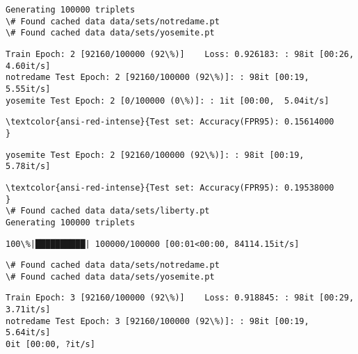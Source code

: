 \documentclass[11pt]{article}
\begin{document}
    \begin{Verbatim}[commandchars=\\\{\}]
Generating 100000 triplets
\# Found cached data data/sets/notredame.pt
\# Found cached data data/sets/yosemite.pt

    \end{Verbatim}

    \begin{Verbatim}[commandchars=\\\{\}]
Train Epoch: 2 [92160/100000 (92\%)]	Loss: 0.926183: : 98it [00:26,  4.60it/s]
notredame Test Epoch: 2 [92160/100000 (92\%)]: : 98it [00:19,  5.55it/s]
yosemite Test Epoch: 2 [0/100000 (0\%)]: : 1it [00:00,  5.04it/s]
    \end{Verbatim}

    \begin{Verbatim}[commandchars=\\\{\}]
\textcolor{ansi-red-intense}{Test set: Accuracy(FPR95): 0.15614000
}

    \end{Verbatim}

    \begin{Verbatim}[commandchars=\\\{\}]
yosemite Test Epoch: 2 [92160/100000 (92\%)]: : 98it [00:19,  5.78it/s]

    \end{Verbatim}

    \begin{Verbatim}[commandchars=\\\{\}]
\textcolor{ansi-red-intense}{Test set: Accuracy(FPR95): 0.19538000
}
\# Found cached data data/sets/liberty.pt
Generating 100000 triplets

    \end{Verbatim}

    \begin{Verbatim}[commandchars=\\\{\}]
100\%|██████████| 100000/100000 [00:01<00:00, 84114.15it/s]

    \end{Verbatim}

    \begin{Verbatim}[commandchars=\\\{\}]
\# Found cached data data/sets/notredame.pt
\# Found cached data data/sets/yosemite.pt

    \end{Verbatim}

    \begin{Verbatim}[commandchars=\\\{\}]
Train Epoch: 3 [92160/100000 (92\%)]	Loss: 0.918845: : 98it [00:29,  3.71it/s]
notredame Test Epoch: 3 [92160/100000 (92\%)]: : 98it [00:19,  5.64it/s]
0it [00:00, ?it/s]
    \end{Verbatim}
\end{document}
